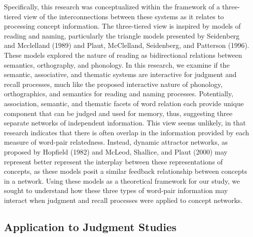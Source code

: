 \documentclass[english,man]{apa6}
\theoremstyle{definition}
\theoremstyle{definition}
\theoremstyle{definition}
\theoremstyle{remark}
\begin{document}
Specifically, this research was conceptualized within the framework of a
three-tiered view of the interconnections between these systems as it
relates to processing concept information. The three-tiered view is
inspired by models of reading and naming, particularly the triangle
models presented by Seidenberg and Mcclelland (1989) and Plaut,
McClelland, Seidenberg, and Patterson (1996). These models explored the
nature of reading as bidirectional relations between semantics,
orthography, and phonology. In this research, we examine if the
semantic, associative, and thematic systems are interactive for judgment
and recall processes, much like the proposed interactive nature of
phonology, orthographics, and semantics for reading and naming
processes. Potentially, association, semantic, and thematic facets of
word relation each provide unique component that can be judged and used
for memory, thus, suggesting three separate networks of independent
information. This view seems unlikely, in that research indicates that
there is often overlap in the information provided by each measure of
word-pair relatedness. Instead, dynamic attractor networks, as proposed
by Hopfield (1982) and McLeod, Shallice, and Plaut (2000) may represent
better represent the interplay between these representations of
concepts, as these models posit a similar feedback relationship between
concepts in a network. Using these models as a theoretical framework for
our study, we sought to understand how these three types of word-pair
information may interact when judgment and recall processes were applied
to concept networks.

\subsection{Application to Judgment
Studies}\label{application-to-judgment-studies}
\end{document}
